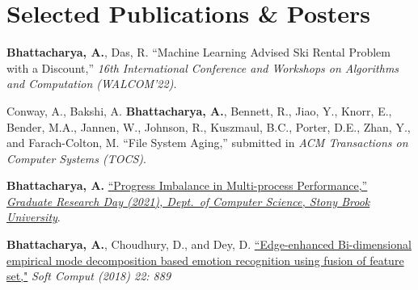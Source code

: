 \documentclass[letterpaper,10pt]{article}
\begin{document}
\section{Selected Publications \& Posters}
\resumeSubHeadingListStart
\item{\textbf{Bhattacharya, A.}, Das, R. {``Machine Learning Advised Ski Rental Problem with a Discount,''} \textit{16th International Conference and Workshops on Algorithms and Computation (WALCOM'22)}.}
\item {Conway, A., Bakshi, A. \textbf{Bhattacharya, A.}, Bennett, R., Jiao, Y., Knorr, E., Bender, M.A., Jannen, W., Johnson, R., Kuszmaul, B.C., Porter, D.E., Zhan, Y., and Farach-Colton, M. {``File System Aging,''} submitted in \textit{ACM Transactions on Computer Systems (TOCS)}.}
\item {\textbf{Bhattacharya, A.} \href{https://www3.cs.stonybrook.edu/~grd/posters/GRD_2021_Poster_Arghya_Bhattacharya.pdf}{``Progress Imbalance in Multi-process Performance,''} \href{https://www3.cs.stonybrook.edu/~grd/index.html}{\textit{Graduate Research Day (2021), Dept.\ of Computer Science, Stony Brook University}}.}
\item {\textbf{Bhattacharya, A.}, Choudhury, D., and Dey, D. \href{https://doi.org/10.1007/s00500-016-2395-4}{``Edge-enhanced Bi-dimensional empirical mode decomposition based emotion recognition using fusion of feature set,"} \textit{Soft Comput (2018) 22: 889}}
\resumeSubHeadingListEnd
\end{document}
